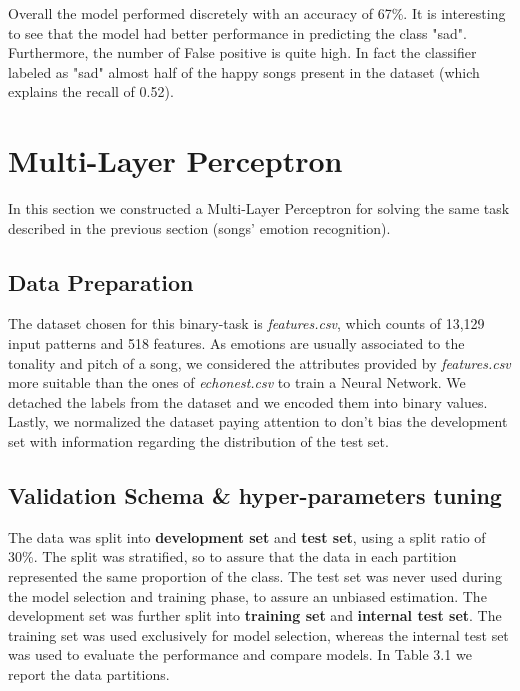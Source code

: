 Overall the model performed discretely with an accuracy of 67\%. It is interesting to see that the model had better performance in predicting the class "sad". Furthermore, the number of False positive is quite high. In fact the classifier labeled as "sad" almost half of the happy songs present in the dataset (which explains the recall of 0.52).

\section{Multi-Layer Perceptron}
In this section we constructed a Multi-Layer Perceptron for solving the same task described in the previous section (songs' emotion recognition). 
\subsection{Data Preparation}
The dataset chosen for this binary-task is \textit{features.csv}, which counts of 13,129 input patterns and 518 features.  As emotions are usually associated to the tonality and pitch of a song, we considered the attributes provided by \textit{features.csv} more suitable than the ones of \textit{echonest.csv} to train a Neural Network. We detached the labels from the dataset and we encoded them into binary values. Lastly, we normalized the dataset paying attention to don't bias the development set with information regarding the distribution of the test set.
\subsection{Validation Schema \& hyper-parameters tuning}
The data was split into \textbf{development set} and \textbf{test set}, using a split ratio of 30\%. The split was stratified, so to assure that the data in each partition represented the same proportion of the class.
The test set was never used during the model selection and training phase, to assure an unbiased estimation. 
The development set was further split into \textbf{training set} and \textbf{internal test set}. The training set was used exclusively for model selection, whereas the internal test set was used to evaluate the performance and compare models. In Table 3.1 we report the data partitions. 

